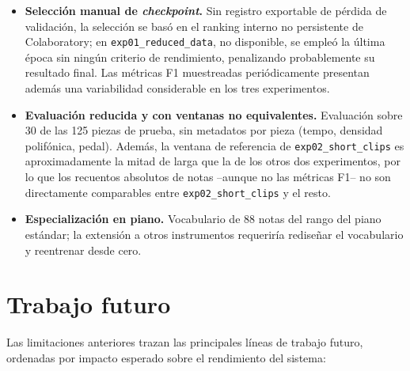 \begin{itemize}
    \item \textbf{Selección manual de \textit{checkpoint}.} Sin
    registro exportable de pérdida de validación, la selección se
    basó en el ranking interno no persistente de Colaboratory; en\newline
    \texttt{exp01\_reduced\_data}, no disponible, se empleó la última
    época sin ningún criterio de rendimiento, penalizando
    probablemente su resultado final. Las métricas F1 muestreadas
    periódicamente presentan además una variabilidad considerable en
    los tres experimentos.

    \item \textbf{Evaluación reducida y con ventanas no
    equivalentes.} Evaluación sobre 30 de las 125 piezas de prueba,
    sin metadatos por pieza (tempo, densidad polifónica, pedal).
    Además, la ventana de referencia de \texttt{exp02\_short\_clips}
    es aproximadamente la mitad de larga que la de los otros dos
    experimentos, por lo que los recuentos absolutos de notas --aunque
    no las métricas F1-- no son directamente comparables entre
    \texttt{exp02\_short\_clips} y el resto.

    \item \textbf{Especialización en piano.} Vocabulario de 88 notas
    del rango del piano estándar; la extensión a otros instrumentos
    requeriría rediseñar el vocabulario y reentrenar desde cero.
\end{itemize}

\section{Trabajo futuro}
\label{sec:trabajo_futuro}

Las limitaciones anteriores trazan las principales líneas de trabajo
futuro, ordenadas por impacto esperado sobre el rendimiento del
sistema:

